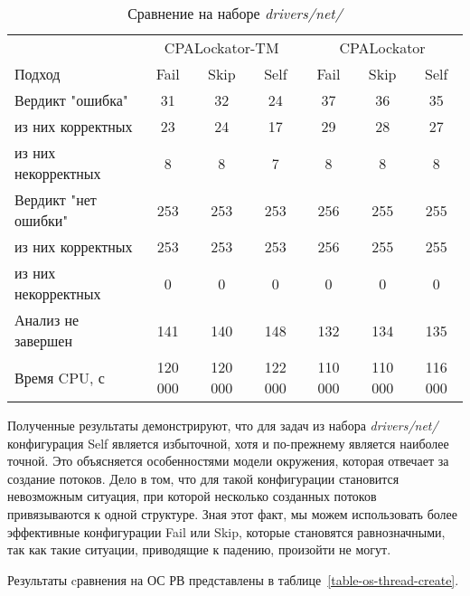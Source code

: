   \begin{table}[h]\footnotesize \centering
    \caption{Сравнение на наборе \textit{drivers/net/}}
  	\label{table-drivers-thread-create}
    \begin{tabular}{ | l | c | c | c | c | c | c |}
      \hline
      				& 		\multicolumn{3}{|c|}{CPALockator-TM} 		& \multicolumn{3}{|c|}{CPALockator} \\
      Подход         				& Fail 		& Skip 		& Self 		& Fail 	& Skip 		& Self  \\ \hline
      Вердикт "ошибка" 				& 31   		& 32   		& 24   		& 37   	& 36   		& 35   \\ 
  \hspace{0.5cm} из них корректных 	& 23 		& 24 		& 17   		& 29   	& 28   		& 27   \\ 
  \hspace{0.5cm} из них некорректных & 8 		& 8 		& 7   		& 8   	& 8   		& 8   \\ \hline
      Вердикт "нет ошибки"  		& 253    	& 253    	& 253   	& 256   & 255  		& 255   \\ 
  \hspace{0.5cm} из них корректных 	& 253 		& 253    	& 253   	& 256   & 255   	& 255   \\
  \hspace{0.5cm} из них некорректных & 0 		& 0    		& 0     	& 0   	& 0   		& 0   \\ \hline
      Анализ не завершен       		& 141    	& 140    	& 148    	& 132   & 134   	& 135   \\ \hline
      Время CPU, с   				& 120 000 	& 120 000 	& 122 000 	& 110 000 & 110 000 & 116 000   \\ 
      \hline
    \end{tabular}
  \end{table}

Полученные результаты демонстрируют, что для задач из набора \textit{drivers/net/} конфигурация Self является избыточной, хотя и по-прежнему является наиболее точной.
Это объясняется особенностями модели окружения, которая отвечает за создание потоков. 
Дело в том, что для такой конфигурации становится невозможным ситуация, при которой несколько созданных потоков привязываются к одной структуре.
Зная этот факт, мы можем использовать более эффективные конфигурации Fail или Skip, которые становятся равнозначными, так как такие ситуации, приводящие к падению, произойти не могут.

Результаты cравнения на ОС РВ представлены в таблице~\ref{table-os-thread-create}.

